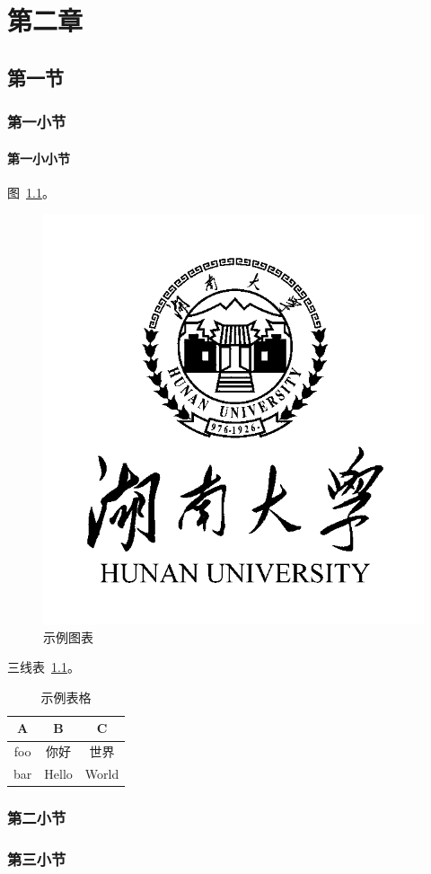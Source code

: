 \chapter{第二章}

\section{第一节}

\subsection{第一小节}

\subsubsection{第一小小节}

图~\ref{fig:demo}。

\begin{figure}[H]
    \centering
    \includegraphics[width=0.3\linewidth]{figures/hnu-logo.png}
    \caption{示例图表}
    \label{fig:demo}
\end{figure}

三线表~\ref{table:demo}。

\begin{table}[H]
    \centering
    \caption{示例表格}
    \label{table:demo}
    \begin{tabular}{ccc}
        \toprule
        A   & B     & C     \\
        \midrule
        foo & 你好  & 世界  \\
        bar & Hello & World \\
        \bottomrule
    \end{tabular}
\end{table}


\subsection{第二小节}

\subsection{第三小节}

